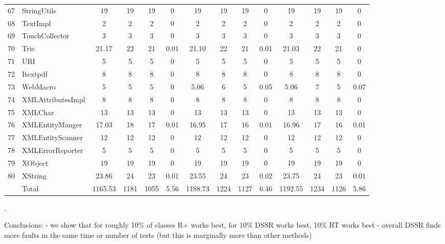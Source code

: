 \documentclass[conference]{IEEEtran}
\begin{document}
\begin{table} [ht]
{\begin{tabular}{|c|l|c|c|c|c|c|c|c|c|c|c|c|c|}
 67						& StringUtils					&19 	&	19	&	19	& 		0					& 19		& 19 		& 19		& 		0			& 19			& 19			& 19			&	0\\      
 68						& TextImpl					& 2 	&	2	&	2	& 		0					& 2		&  2		& 2		& 		0			& 2			& 2			& 2			&	0\\      
 69						& TouchCollector				& 3	&	3	&	3	& 		0					& 3		&  3		& 3		& 		0			& 3			& 3			& 3			&	0\\      
 70						& Trie						& 21.17&	22	&	21	& 		0.01					& 21.10	&  22		& 21		& 		0.01			& 21.03		& 22			& 21			&	0\\      
 71						& URI						& 5 	&	5	&	5	& 		0					& 5		&  5		& 5		& 		0			& 5			& 5			& 5			&	0\\      
 72						& Itextpdf						& 8	&	8	&	8	& 		0					& 8		&  8		& 8		& 		0			& 8			& 8			& 8			&	0\\      
 73						& WebMacro					& 5	&	5	&	5	& 		0					& 5.06	&  6		& 5		& 		0.05			& 5.06		& 7			& 5			&	0.07\\      
 74						& XMLAttributesImpl				& 8	&	8	&	8	& 		0					& 8		&  8		& 8		& 		0			& 8			& 8			& 8			&	0\\      
 75						& XMLChar					& 13	&	13	&	13	& 		0					& 13		&  13		& 13		& 		0			& 13			& 13			& 13			&	0\\      
 76						& XMLEntityManger				& 17.03&	18	&	17	& 		0.01					& 16.95	&  17		& 16		& 		0.01			& 16.96		& 17			& 16			&	0.01\\      
 77						& XMLEntityScanner				& 12	&	12	&	12	& 		0					& 12		&  12		& 12		& 		0			& 12			& 12			& 12			&	0\\      
 78						& XMLErrorReporter				& 5	&	5	&	5	& 		0					& 5		&  5		& 5		& 		0			& 5			& 5			& 5			&	0\\      
 79						& XObject						& 19	&	19	&	19	& 		0					& 19		&  19		& 19		& 		0			& 19			& 19			& 19			&	0\\      
 80						& XString						& 23.86&	24	&	23	& 		0.01					& 23.55	&  24		& 23		& 		0.02			& 23.75		& 24			& 23			&	0.01\\      
    \hline 
    						& Total						&1165.53	& 1181	&    1055	&		5.56					& 1188.73		&	1224	&	1127	&	6.46			& 1192.55		& 1234		& 1126		& 	5.86\\
   \hline
     \end{tabular}
    \label{table:Results}
     }
     \end{table}
\newpage.





Conclusions: 
- we show that for roughly 10\% of classes R+ works best, for 10\% DSSR works best, 10\% RT works best
- overall DSSR finds more faults in the same time or number of tests (but this is marginally more than other methods)
\end{document}
